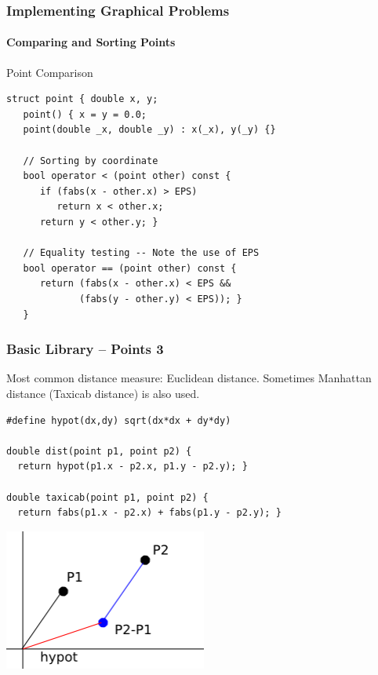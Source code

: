 \documentclass{beamer}
\begin{document}
\begin{frame}[fragile]
  \frametitle{Implementing Graphical Problems}
  \framesubtitle{Comparing and Sorting Points}

  {\smaller
    
    \begin{exampleblock}{Point Comparison}
\begin{verbatim}
struct point { double x, y;
   point() { x = y = 0.0;
   point(double _x, double _y) : x(_x), y(_y) {}

   // Sorting by coordinate
   bool operator < (point other) const {
      if (fabs(x - other.x) > EPS)
         return x < other.x;
      return y < other.y; }

   // Equality testing -- Note the use of EPS
   bool operator == (point other) const {
      return (fabs(x - other.x) < EPS &&  
             (fabs(y - other.y) < EPS)); }
   }
\end{verbatim}
    \end{exampleblock}
  }
\end{frame}

\begin{frame}[fragile]
  \frametitle{Basic Library -- Points 3}
  {\smaller

    Most common distance measure: Euclidean distance. Sometimes
    Manhattan distance (Taxicab distance) is also used.
    
    \begin{exampleblock}{}
\begin{verbatim}
#define hypot(dx,dy) sqrt(dx*dx + dy*dy)

double dist(point p1, point p2) {
  return hypot(p1.x - p2.x, p1.y - p2.y); }

double taxicab(point p1, point p2) {
  return fabs(p1.x - p2.x) + fabs(p1.y - p2.y); }
\end{verbatim}
    \end{exampleblock}

    \begin{center}
      \includegraphics[width=0.5\textwidth]{../img/geom1}
    \end{center}
  }
\end{frame}
  
\end{document}
